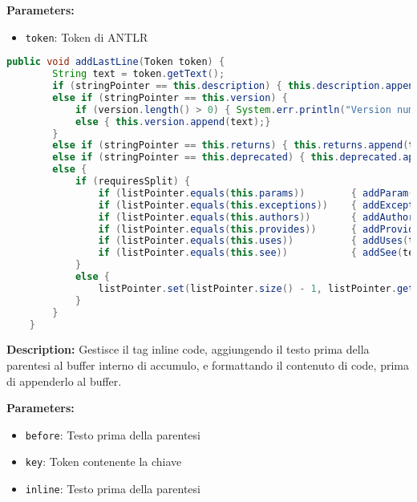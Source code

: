 \textbf{Parameters:}
\begin{itemize}
  \item\texttt{token}: Token di ANTLR  
\end{itemize}

\begin{lstlisting}[language=Java]
    public void addLastLine(Token token) {
        String text = token.getText();
        if (stringPointer == this.description) { this.description.append(text); }
        else if (stringPointer == this.version) {
            if (version.length() > 0) { System.err.println("Version number must be specified on a single line at line " + token.getLine()); }
            else { this.version.append(text);}
        }
        else if (stringPointer == this.returns) { this.returns.append(text); }
        else if (stringPointer == this.deprecated) { this.deprecated.append(text); }
        else {
            if (requiresSplit) {
                if (listPointer.equals(this.params))        { addParam(text); }
                if (listPointer.equals(this.exceptions))    { addException(text); }
                if (listPointer.equals(this.authors))       { addAuthor(text); }
                if (listPointer.equals(this.provides))      { addProvides(text); }
                if (listPointer.equals(this.uses))          { addUses(text); }
                if (listPointer.equals(this.see))           { addSee(text); }
            }
            else {
                listPointer.set(listPointer.size() - 1, listPointer.get(listPointer.size() - 1).concat(" " + text));
            }
        }
    }
\end{lstlisting}
\vspace{0.5cm}
\textbf{Description:}  Gestisce il tag inline code, aggiungendo il testo prima della parentesi al buffer interno di accumulo, e formattando il contenuto di \atsign code, prima di appenderlo al buffer.  

\textbf{Parameters:}
\begin{itemize}
  \item\texttt{before}: Testo prima della parentesi 
  \item\texttt{key}: Token contenente la chiave 
  \item\texttt{inline}: Testo prima della parentesi  
\end{itemize}

